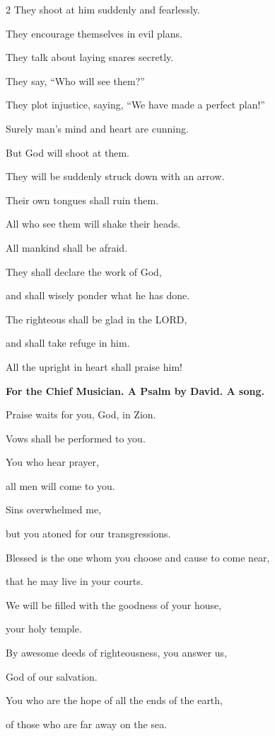 \begin{multicols}{2}
	They shoot at him suddenly and fearlessly.
	
	
	\myverse{}They encourage themselves in evil plans.
	
	They talk about laying snares secretly.
	
	They say, “Who will see them?”
	
	
	\myverse{}They plot injustice, saying, “We have made a perfect plan!”
	
	Surely man’s mind and heart are cunning.
	
	
	\myverse{}But God will shoot at them.
	
	They will be suddenly struck down with an arrow.
	
	
	\myverse{}Their own tongues shall ruin them.
	
	All who see them will shake their heads.
	
	
	\myverse{}All mankind shall be afraid.
	
	They shall declare the work of God,
	
	and shall wisely ponder what he has done.
	
	
	\myverse{}The righteous shall be glad in the LORD,
	
	and shall take refuge in him.
	
	All the upright in heart shall praise him!
	
	
	\mychapter{}\textbf{For the Chief Musician. A Psalm by David. A song.}
	
	\myverse*{}Praise waits for you, God, in Zion.
	
	Vows shall be performed to you.
	
	
	\myverse{}You who hear prayer,
	
	all men will come to you.
	
	
	\myverse{}Sins overwhelmed me,
	
	but you atoned for our transgressions.
	
	
	\myverse{}Blessed is the one whom you choose and cause to come near,
	
	that he may live in your courts.
	
	We will be filled with the goodness of your house,
	
	your holy temple.
	
	
	\myverse{}By awesome deeds of righteousness, you answer us,
	
	God of our salvation.
	
	You who are the hope of all the ends of the earth,
	
	of those who are far away on the sea.
	

\end{multicols}
